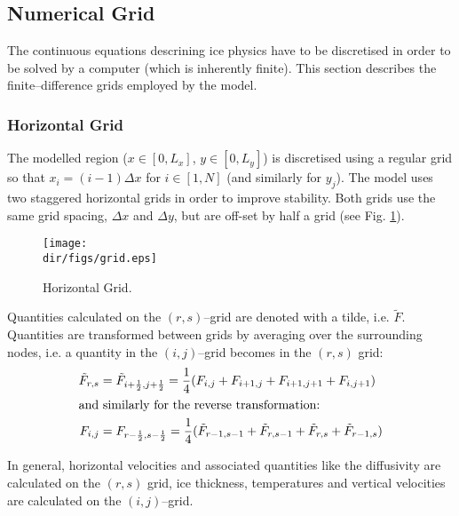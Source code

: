 \subsection{Numerical Grid}\label{num.sec.grid}
The continuous equations descrining ice physics have to be discretised in order to be solved by a computer (which is inherently finite). This section describes the finite--difference grids employed by the model.
\subsubsection{Horizontal Grid}
The modelled region ($x\in[0,L_x]$, $y\in[0,L_y]$) is discretised using a regular grid so that $x_i=(i-1)\Delta x$ for $i\in[1,N]$ (and similarly for $y_j$). The model uses two staggered horizontal grids in order to improve stability. Both grids use the same grid spacing, $\Delta x$ and $\Delta y$, but are off-set by half a grid (see Fig. \ref{kin.fig.grid}). 
\begin{figure}[htbp]
  \begin{center}
    \texttt{[image: \\dir/figs/grid.eps]}
    \caption{Horizontal Grid.}
    \label{kin.fig.grid}
  \end{center}
\end{figure}
Quantities calculated on the $(r,s)$--grid are denoted with a tilde, i.e. $\tilde{F}$. Quantities are transformed between grids by averaging over the surrounding nodes, i.e. a quantity in the $(i,j)$--grid becomes in the $(r,s)$ grid:
\begin{subequations}
  \begin{align}
    \tilde{F}_{r,s}&=\tilde{F}_{i+\frac12,j+\frac12}=\frac14(F_{i,j}+F_{i+1,j}+F_{i+1,j+1}+F_{i,j+1})\\
    \intertext{and similarly for the reverse transformation:}
    F_{i,j}&=F_{r-\frac12,s-\frac12}=\frac14(\tilde{F}_{r-1,s-1}+\tilde{F}_{r,s-1}+\tilde{F}_{r,s}+\tilde{F}_{r-1,s})
  \end{align}
\end{subequations}

In general, horizontal velocities and associated quantities like the diffusivity are calculated on the $(r,s)$ grid, ice thickness, temperatures and vertical velocities are calculated on the $(i,j)$--grid.

